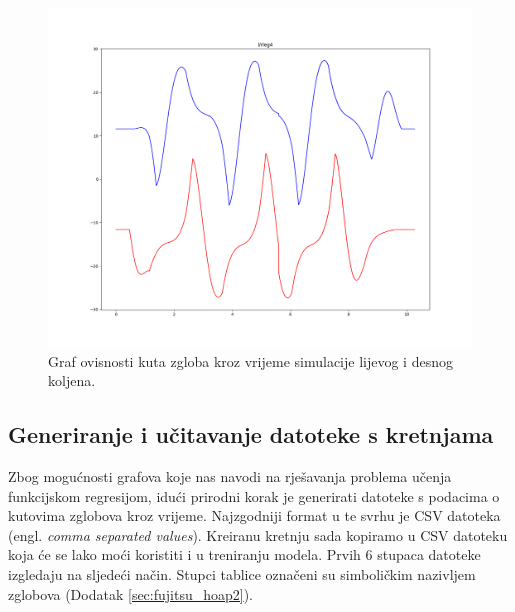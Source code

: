 \documentclass[times, utf8, zavrsni]{fer}
\begin{document}

\begin{figure}[htb!]
\centering
\includegraphics[height=0.75\textwidth]{anglePhase.png}
\caption{Graf ovisnosti kuta zgloba kroz vrijeme simulacije lijevog i desnog koljena.}
\label{fig:leg_phase}
\end{figure}

\subsection{Generiranje i učitavanje datoteke s kretnjama}
Zbog mogućnosti grafova koje nas navodi na rješavanja problema učenja funkcijskom regresijom, idući prirodni korak je generirati datoteke s podacima o kutovima zglobova kroz vrijeme. Najzgodniji format u te svrhu je CSV datoteka (engl. \textit{comma separated values}). Kreiranu kretnju sada kopiramo u CSV datoteku koja će se lako moći koristiti i u treniranju modela. Prvih 6 stupaca datoteke izgledaju na sljedeći način. Stupci tablice označeni su simboličkim nazivljem zglobova (Dodatak \ref{sec:fujitsu_hoap2}). 
\end{document}

